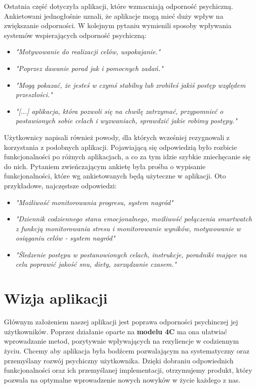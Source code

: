 Ostatnia część dotyczyła aplikacji, które wzmacniają odporność psychiczną.
Ankietowani jednogłośnie uznali, że aplikacje mogą mieć duży wpływ na
zwiększanie odporności. W kolejnym pytaniu wymienili sposoby wpływania systemów
wspierających odporność psychiczną:
\begin{itemize}
    \item \textit{"Motywowanie do realizacji celów, uspokajanie."}
    \item \textit{"Poprzez dawanie porad jak i pomocnych zadań."}
    \item \textit{"Mogą pokazać, że jesteś w czymś stabilny lub zrobiłeś jakiś
              postęp względem przeszłości."}
    \item \textit{"[...] aplikacja, która pozwoli się na chwilę zatrzymać,
          przypomnieć o postawionych sobie celach i wyzwaniach, sprawdzić jakie
          robimy postępy."}
\end{itemize}
Użytkownicy napisali również powody, dla których wcześniej rezygnowali z
korzystania z podobnych aplikacji. Pojawiającą się odpowiedzią było rozbicie
funkcjonalności po różnych aplikacjach, a co za tym idzie szybkie zniechęcanie
się do nich. Pytaniem zwieńczającym ankietę była prośba o wypisanie
funkcjonalności, które wg ankietowanych będą użyteczne w aplikacji. Oto
przykładowe, najczęstsze odpowiedzi:
\begin{itemize}
    \item \textit{"Możliwość monitorowania progresu, system nagród"}
    \item \textit{"Dziennik codziennego stanu emocjonalnego, możliwość
              połączenia smartwatch z funkcją monitorowania stresu i
              monitorowanie wyników, motywowanie w osiąganiu celów - system
              nagród"}
    \item \textit{"Śledzenie postępu w postanowionych celach, instrukcje,
              poradniki mające na celu poprawić jakość snu, diety, zarządzanie
              czasem."}
\end{itemize}

\section{Wizja aplikacji}
Głównym założeniem naszej aplikacji jest poprawa odporności psychinczej jej
użytkowników. Poprzez działanie oparte na \textbf{modelu 4C} ma ona ułatwiać
wprowadzanie metod, pozytywnie wpływających na rezyliencje w codziennym życiu.
Chcemy aby aplikacja była bodźcem pozwalającym na systematyczny oraz przemyślany
rozwój psychiczny użytkownika. Dzięki dobraniu odpowiednich funkcjonalności oraz
ich przemyślanej implementacji, otrzymujemy produkt, który pozwala na optymalne
wprowadzenie nowych nowyków w życie każdego z nas.

